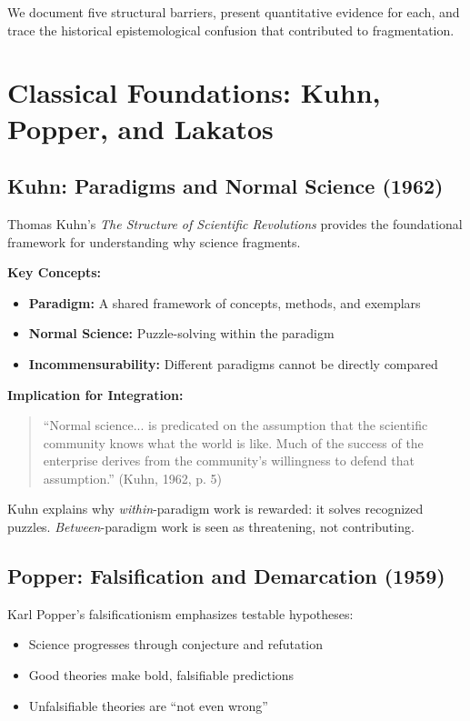 \documentclass[12pt,a4paper]{article}
\begin{document}
We document five structural barriers, present quantitative evidence for each, and trace the historical epistemological confusion that contributed to fragmentation.

\section{Classical Foundations: Kuhn, Popper, and Lakatos}
\label{sec:classics}

\subsection{Kuhn: Paradigms and Normal Science (1962)}

Thomas Kuhn's \textit{The Structure of Scientific Revolutions} provides the foundational framework for understanding why science fragments.

\textbf{Key Concepts:}
\begin{itemize}
\item \textbf{Paradigm:} A shared framework of concepts, methods, and exemplars
\item \textbf{Normal Science:} Puzzle-solving within the paradigm
\item \textbf{Incommensurability:} Different paradigms cannot be directly compared
\end{itemize}

\textbf{Implication for Integration:}
\begin{quote}
``Normal science... is predicated on the assumption that the scientific community knows what the world is like. Much of the success of the enterprise derives from the community's willingness to defend that assumption.'' (Kuhn, 1962, p. 5)
\end{quote}

Kuhn explains why \textit{within}-paradigm work is rewarded: it solves recognized puzzles. \textit{Between}-paradigm work is seen as threatening, not contributing.

\subsection{Popper: Falsification and Demarcation (1959)}

Karl Popper's falsificationism emphasizes testable hypotheses:
\begin{itemize}
\item Science progresses through conjecture and refutation
\item Good theories make bold, falsifiable predictions
\item Unfalsifiable theories are ``not even wrong''
\end{itemize}
\end{document}
